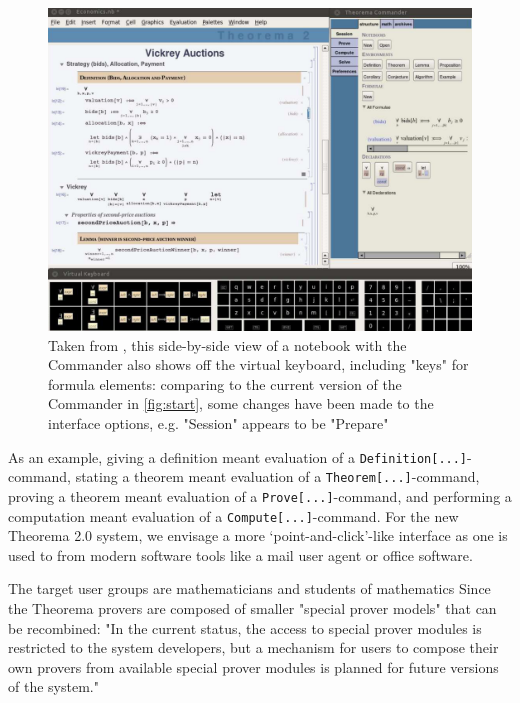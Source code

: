 \begin{figure}[h]
    \centering
    \includegraphics[scale=0.5]{images/theory/virtual-keyboard-linux.png}
    \caption{Taken from \cite{windsteiger_theorema_2013}, this side-by-side view of a notebook with the Commander also shows off the virtual keyboard, including "keys" for formula elements: comparing to the current version of the Commander in \ref{fig:start}, some changes have been made to the interface options, e.g. "Session" appears to be "Prepare"}
    \label{fig:virtual-keyboard}
\end{figure}

\begin{displayquote}
As an example, giving a definition meant evaluation of a \lstinline+Definition[...]+-command, stating a theorem meant evaluation of a \lstinline+Theorem[...]+-command, proving a theorem meant evaluation of a \lstinline+Prove[...]+-command, and performing a computation meant evaluation of a \lstinline+Compute[...]+-command. For the new Theorema 2.0 system, we envisage a more ‘point-and-click’-like interface as one is used to from modern software tools like a mail user agent or office software.
\cite[p. 73]{windsteiger_theorema_2013}
\end{displayquote}

The target user groups are mathematicians and students of mathematics \cite[p. 73]{windsteiger_theorema_2013} Since the Theorema provers are composed of smaller "special prover models" that can be recombined: "In the current status, the access to special prover modules is restricted to the system developers, but a mechanism for users to compose their own provers from available special prover modules is planned for future versions of the system." \cite[p. 111]{g_mayrhofer_s_saminger__w_winsteiger_theorema_nodate}

